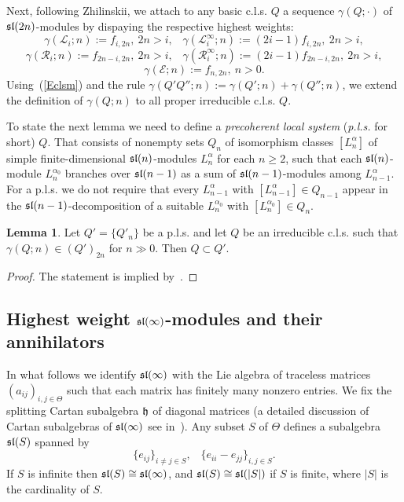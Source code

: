 \documentclass[10pt]{amsart}\oddsidemargin -1mm \evensidemargin -1mm \topmargin -15mm\headheight5mm \headsep 3.5mm \textheight 245mm\textwidth 170mm
\theoremstyle{definition}\newtheorem{theorem}{Theorem}[section]\newtheorem{lemma}[theorem]{Lemma}\newtheorem{remark}[theorem]{Remark}\newtheorem{proposition}[theorem]{Proposition}\newtheorem{corollary}[theorem]{Corollary}\newtheorem{definition}[theorem]{Definition}\newtheorem{Ex}[theorem]{Example}\newtheorem{obs}[theorem]{Observation}\newtheorem{nota}[theorem]{Notation}
\begin{document}
Next, following Zhilinskii, we attach to any basic c.l.s. $Q$ a sequence $\gamma(Q; \cdot)$ of $\frak{sl}(2n)$-modules by dispaying the respective highest weights:
$$\gamma(\mathcal L_i; n):=f_{i, 2n},~2n> i,\hspace{10pt}\gamma(\mathcal L_i^{\infty}; n):=(2i-1)f_{i, 2n},~2n>i,$$
$$\gamma(\mathcal R_i; n):=f_{2n-i, 2n},~2n>i,\hspace{10pt}\gamma(\mathcal R_i^{\infty}; n):=(2i-1)f_{2n-i, 2n},~2n>i,$$
$$\gamma(\mathcal E; n):=f_{n, 2n},~n>0.$$
Using~(\ref{Eclsm}) and the rule $\gamma(Q'Q''; n):=\gamma(Q'; n)+\gamma(Q''; n)$, we extend the definition of $\gamma(Q; n)$ to all proper irreducible c.l.s. $Q$. 

To state the next lemma we need to define a {\it precoherent local system} ({\it p.l.s.} for short) $Q$. 
That consists of nonempty sets $Q_n$ of isomorphism classes $[L_n^\alpha]$ of simple finite-dimensional $\frak{sl}(n)$-modules $L_n^\alpha$ for each $n\ge2$, such that each $\frak{sl}(n)$-module $L_n^{\alpha_0}$ branches over $\frak{sl}(n-1)$ as a sum of $\frak{sl}(n-1)$-modules among $L_{n-1}^{\alpha}$. 
For a p.l.s. we do not require that  every $L_{n-1}^\alpha$ with $[L_{n-1}^\alpha]\in Q_{n-1}$ appear in the $\frak{sl}(n-1)$-decomposition of a suitable $L_n^{\alpha_0}$ with $[L_n^{\alpha_0}]\in Q_n$. 

\begin{lemma}\label{Lqch}Let $Q'=\{Q'_n\}$ be a p.l.s. and let $Q$ be an irreducible c.l.s. such that $\gamma(Q; n)\in (Q')_{2n}$ for $n\gg0$. Then $Q\subset Q'$.\end{lemma}
\begin{proof}The statement is implied by~\cite[Lemma~2.3.2]{Zh1}.\end{proof}

\subsection{Highest weight $\frak{sl}(\infty)$-modules and their annihilators}\label{SShwuan}
In what follows we identify $\frak{sl}(\infty)$ with the Lie algebra of traceless matrices $(a_{ij})_{i,j\in\Theta}$ such that each matrix has finitely many nonzero entries. 
We fix the splitting Cartan subalgebra $\frak h$ of diagonal matrices (a detailed discussion of Cartan subalgebras of $\frak{sl}(\infty)$ see in~\cite{DPS}).  
Any subset $S$ of $\Theta$ defines a subalgebra $\frak{sl}(S)$ spanned by
$$\{e_{ij}\}_{i\ne j\in S},\hspace{10pt}\{e_{ii}-e_{jj}\}_{i, j\in S}.$$
If $S$ is infinite then $\frak{sl}(S)\cong\frak{sl}(\infty)$, and $\frak{sl}(S)\cong\frak{sl}(|S|)$ if $S$ is finite, where $|S|$ is the cardinality of $S$.
\end{document}

